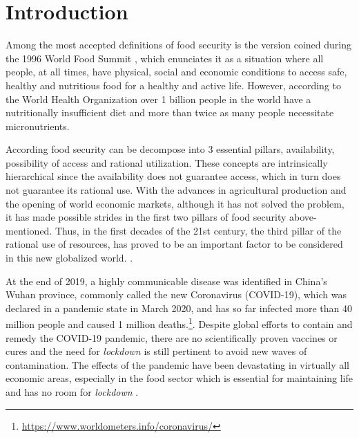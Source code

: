 \chapter{Introduction}


\noindent

Among the most accepted definitions of food security is the version coined during the 1996 World Food Summit \cite{shaw2007world}, which enunciates it as a situation where all people, at all times, have physical, social and economic conditions to access safe, healthy and nutritious food for a healthy and active life. However, according to the World Health Organization \cite{world2009global} over 1 billion people in the world have a nutritionally insufficient diet and more than twice as many people necessitate micronutrients.

According food security can be decompose into 3 essential pillars, availability, possibility of access and rational utilization. These concepts are intrinsically
hierarchical since the availability does not guarantee access, which in turn does not guarantee its rational use. With the advances in agricultural production and the opening of world economic markets, although it has not solved the problem, it has made possible strides in the first two pillars of food security above-mentioned. Thus, in the first decades of the 21st century, the third pillar of the rational use of resources, has proved to be an important factor to be considered in this new globalized world. \cite{barrett2010}.

At the end of 2019, a highly communicable disease was identified in China's Wuhan province, commonly called the new Coronavirus (COVID-19), which was declared in a pandemic state in March 2020, and has so far infected more than 40 million people and caused 1 million  deaths.\footnote{\url{https://www.worldometers.info/coronavirus/}}. Despite global efforts to contain and remedy the COVID-19 pandemic, there are no scientifically proven vaccines or cures and the need for \textit{lockdown} is still pertinent to avoid new waves of contamination. The effects of the pandemic have been devastating in virtually all economic areas, especially in the food sector which is essential for maintaining life and has no room for \textit{lockdown} \cite{galanakis2020food}.

